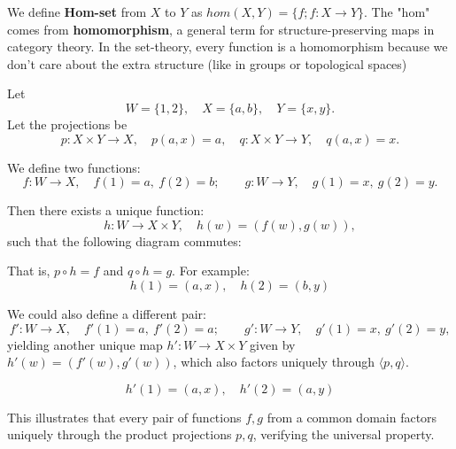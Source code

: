 We define \textbf{Hom-set} from $X$ to $Y$ as $hom(X, Y) = \{f; f: X \to Y\}$. The "hom" comes from \textbf{homomorphism}, a general term for structure-preserving maps in category theory. In the set-theory, every function is a homomorphism because we don't care about the extra structure (like in groups or topological spaces)



\begin{examplebox}[title={Universal Property of the Product}]
Let 
\[
W = \{1, 2\}, \quad X = \{a, b\}, \quad Y = \{x, y\}.
\]
Let the projections be 
\[
p: X \times Y \to X, \quad p(a, x) = a, \quad q: X \times Y \to Y, \quad q(a, x) = x.
\]

We define two functions:
\[
f: W \to X, \quad f(1) = a,\ f(2) = b; \qquad
g: W \to Y, \quad g(1) = x,\ g(2) = y.
\]

Then there exists a unique function:
\[
h: W \to X \times Y, \quad h(w) = (f(w), g(w)),
\]
such that the following diagram commutes:

\begin{center}
\end{center}

That is, \( p \circ h = f \) and \( q \circ h = g \). For example:
\[
h(1) = (a, x), \quad h(2) = (b, y)
\]

We could also define a different pair:
\[
f': W \to X, \quad f'(1) = a,\ f'(2) = a; \qquad
g': W \to Y, \quad g'(1) = x,\ g'(2) = y,
\]
yielding another unique map \( h': W \to X \times Y \) given by \( h'(w) = (f'(w), g'(w)) \), which also factors uniquely through \( \langle p, q \rangle \).

\[
h'(1) = (a, x), \quad h'(2) = (a, y)
\]

This illustrates that every pair of functions \( f, g \) from a common domain factors uniquely through the product projections \( p, q \), verifying the universal property.

\end{examplebox}
